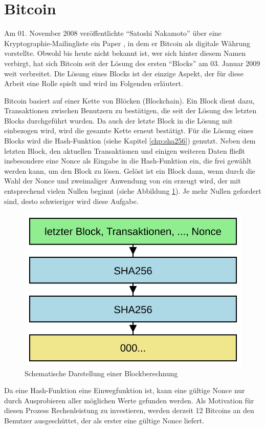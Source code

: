 \section{Bitcoin}
\label{sec:bitcoin}

Am 01. November 2008 veröffentlichte "`Satoshi Nakamoto"' über eine Kryptographie-Mailingliste \cite{bitcoinmailinglist} ein Paper \cite{bitcoinpaper},
in dem er Bitcoin als digitale Währung vorstellte. Obwohl bis heute nicht bekannt ist, wer sich hinter diesem Namen verbirgt, hat sich Bitcoin seit der
Lösung des ersten "`Blocks"' am 03. Januar 2009 \cite{bitcoinblock0} weit verbreitet. Die Lösung eines Blocks ist der einzige Aspekt, der für
diese Arbeit eine Rolle spielt und wird im Folgenden erläutert.

Bitcoin basiert auf einer Kette von Blöcken (Blockchain). Ein Block dient dazu, Transaktionen zwischen Benutzern zu bestätigen, die seit der Lösung
des letzten Blocks durchgeführt wurden. Da auch der letzte Block in die Lösung mit einbezogen wird, wird die gesamte Kette erneut bestätigt.
Für die Lösung eines Blocks wird die Hash-Funktion  (siehe Kapitel \ref{chp:sha256}) genutzt. Neben dem letzten Block, den aktuellen Transaktionen
und einigen weiteren Daten fließt insbesondere eine Nonce als Eingabe in die Hash-Funktion ein, die frei gewählt werden kann, um den Block zu lösen. Gelöst ist ein
Block dann, wenn durch die Wahl der Nonce und zweimaliger Anwendung von  ein  erzeugt wird, der mit entsprechend vielen Nullen beginnt
(siehe Abbildung \ref{fig:bitcoin}). Je mehr Nullen gefordert sind, desto schwieriger wird diese Aufgabe.

\begin{figure}[!h]
  \centering
  \includegraphics[scale=0.4]{images/bitcoin}
  \caption{Schematische Darstellung einer Blockberechnung}
  \label{fig:bitcoin}
\end{figure}

Da eine Hash-Funktion eine Einwegfunktion ist, kann eine gültige Nonce nur durch Ausprobieren aller möglichen Werte gefunden werden. Als Motivation
für diesen Prozess Rechenleistung zu investieren, werden derzeit 12 Bitcoins an den Benutzer ausgeschüttet, der als erster eine gültige Nonce liefert.



